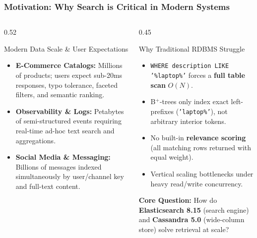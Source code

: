 \documentclass[aspectratio=169]{beamer}
\begin{document}
\begin{frame}
\frametitle{Motivation: Why Search is Critical in Modern Systems}
\begin{columns}[T]
\begin{column}{0.52\textwidth}
\begin{block}{Modern Data Scale \& User Expectations}
\small
\begin{itemize}
    \item \textbf{E-Commerce Catalogs:} Millions of products; users expect sub-20ms responses, typo tolerance, faceted filters, and semantic ranking.
    \item \textbf{Observability \& Logs:} Petabytes of semi-structured events requiring real-time ad-hoc text search and aggregations.
    \item \textbf{Social Media \& Messaging:} Billions of messages indexed simultaneously by user/channel key and full-text content.
\end{itemize}
\end{block}
\end{column}
\begin{column}{0.45\textwidth}
\begin{alertblock}{Why Traditional RDBMS Struggle}
\small
\begin{itemize}
    \item \texttt{WHERE description LIKE '\%laptop\%'} forces a \textbf{full table scan} $O(N)$.
    \item B$^+$-trees only index exact left-prefixes (\texttt{'laptop\%'}), not arbitrary interior tokens.
    \item No built-in \textbf{relevance scoring} (all matching rows returned with equal weight).
    \item Vertical scaling bottlenecks under heavy read/write concurrency.
\end{itemize}
\end{alertblock}
\vspace{0.05cm}
\small
\textbf{Core Question:} How do \textbf{Elasticsearch 8.15} (search engine) and \textbf{Cassandra 5.0} (wide-column store) solve retrieval at scale?
\end{column}
\end{columns}
\end{frame}
\end{document}
